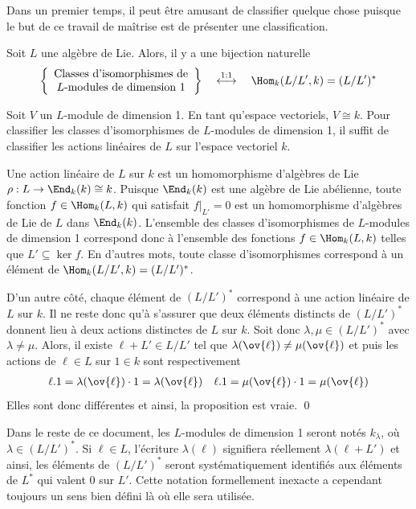 Dans un premier temps, il peut être amusant de classifier quelque chose puisque le but de ce travail de maîtrise est de présenter une classification.

\begin{Prop} \label{modulesdimension1} Soit $L$ une algèbre de Lie. Alors, il y a une bijection naturelle
$$ \left\{\begin{array}{c} \text{Classes d'isomorphismes de}\\
L\text{-modules de dimension 1} \end{array}\right\} \quad \stackrel{1:1}{\longleftrightarrow} \quad \Hom_k(L/L',k) = (L/L')^* $$
\begin{pre} Soit $V$ un $L$-module de dimension 1. En tant qu'espace vectoriels, $V \cong k$. Pour classifier les classes d'isomorphismes de $L$-modules de dimension 1, il suffit de classifier les actions linéaires de $L$ sur l'espace vectoriel $k$.

Une action linéaire de $L$ sur $k$ est un homomorphisme d'algèbres de Lie \linebreak $\rho : L \rightarrow \End_k(k) \cong k$. Puisque $\End_k(k)$ est une algèbre de Lie abélienne, toute fonction $f \in \Hom_k(L,k)$ qui satisfait $f|_{L'} = 0$ est un homomorphisme d'algèbres de Lie de $L$ dans $\End_k(k)$. L'ensemble des classes d'isomorphismes de $L$-modules de dimension 1 correspond donc à l'ensemble des fonctions $f \in \Hom_k(L,k)$ telles que $L' \subseteq \ker f$. En d'autres mots, toute classe d'isomorphismes correspond à un élément de $\Hom_k(L/L',k) = (L/L')^*$.

D'un autre côté, chaque élément de $(L/L')^*$ correspond à une action linéaire de $L$ sur $k$. Il ne reste donc qu'à s'assurer que deux éléments distincts de $(L/L')^*$ donnent lieu à deux actions distinctes de $L$ sur $k$. Soit donc $\lambda, \mu \in (L/L')^*$ avec $\lambda \neq \mu$. Alors, il existe $\ell + L' \in L/L'$ tel que $\lambda(\ov{\ell}) \neq \mu(\ov{\ell})$ et puis les actions de $\ell \in L$ sur $1 \in k$ sont respectivement
\begin{align*}
\ell.1 = \lambda(\ov{\ell}) \cdot 1 = \lambda(\ov{\ell}) && \ell.1 = \mu(\ov{\ell}) \cdot 1 = \mu(\ov{\ell})
\end{align*}
Elles sont donc différentes et ainsi, la proposition est vraie. \qed
\end{pre}
\end{Prop}

Dans le reste de ce document, les $L$-modules de dimension 1 seront notés $k_\lambda$, où $\lambda \in (L/L')^*$. Si $\ell \in L$, l'écriture $\lambda(\ell)$ signifiera réellement $\lambda(\ell + L')$ et ainsi, les éléments de $(L/L')^*$ seront systématiquement identifiés aux éléments de $L^*$ qui valent $0$ sur $L'$. Cette notation formellement inexacte a cependant toujours un sens bien défini là où elle sera utilisée.

